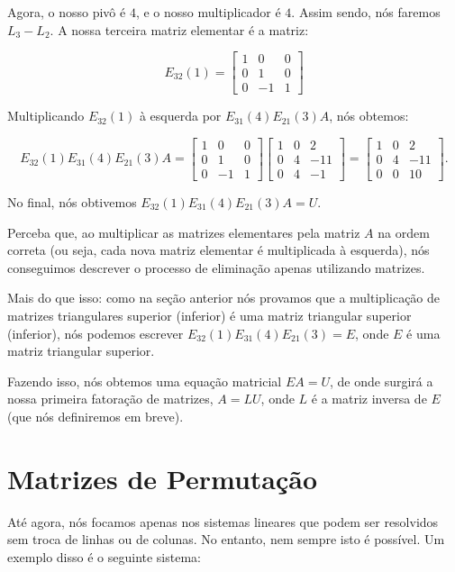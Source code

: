\begin{Example}
	Agora, o nosso pivô é $4$, e o nosso multiplicador é $4$. Assim sendo, nós faremos $L_3 - L_2$. A nossa terceira matriz elementar é a matriz:
	
	$$
	E_{32}(1) = \begin{bmatrix}
		1 & 0 & 0 \\
		0 & 1 & 0 \\
		0 & -1 & 1
	\end{bmatrix}
	$$
	
	Multiplicando $E_{32}(1)$ à esquerda por $E_{31}(4)E_{21}(3)A$, nós obtemos:
	
	$$
	E_{32}(1)E_{31}(4)E_{21}(3)A = \begin{bmatrix}
		1 & 0 & 0 \\
		0 & 1 & 0 \\
		0 & -1 & 1
	\end{bmatrix}
	\begin{bmatrix}
		1 & 0 & 2 \\
		0 & 4 & -11 \\
		0 & 4 & -1
	\end{bmatrix} = 
	\begin{bmatrix}
		1 & 0 & 2 \\
		0 & 4 & -11 \\
		0 & 0 & 10
	\end{bmatrix}.
	$$
	
	No final, nós obtivemos $E_{32}(1)E_{31}(4)E_{21}(3)A = U$.
\end{Example}

Perceba que, ao multiplicar as matrizes elementares pela matriz $A$ na ordem correta (ou seja, cada nova matriz elementar é multiplicada à esquerda), nós conseguimos descrever o processo de eliminação apenas utilizando matrizes. 

Mais do que isso: como na seção anterior nós provamos que a multiplicação de matrizes triangulares superior (inferior) é uma matriz triangular superior (inferior), nós podemos escrever $E_{32}(1)E_{31}(4)E_{21}(3) = E$, onde $E$ é uma matriz triangular superior.

Fazendo isso, nós obtemos uma equação matricial $EA = U$, de onde surgirá a nossa primeira fatoração de matrizes, $A = LU$, onde $L$ é a matriz inversa de $E$ (que nós definiremos em breve).

\section{Matrizes de Permutação}

Até agora, nós focamos apenas nos sistemas lineares que podem ser resolvidos sem troca de linhas ou de colunas. No entanto, nem sempre isto é possível. Um exemplo disso é o seguinte sistema:

